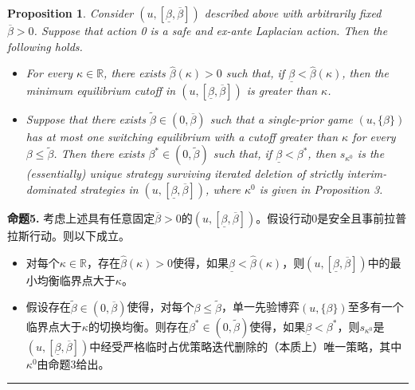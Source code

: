 \documentclass[12pt,a4paper]{article}
\newenvironment{translation}
  {\par\noindent\color{darkblue}\ignorespaces}
  {\par\medskip\noindent\hrule\par\medskip}
\newtheorem{proposition}[theorem]{Proposition}
\theoremstyle{definition}
\theoremstyle{remark}
\begin{document}
\begin{proposition}
Consider $(u, [\underline{\beta}, \overline{\beta}])$ described above with arbitrarily fixed $\overline{\beta} > 0$. Suppose that action 0 is a safe and ex-ante Laplacian action. Then the following holds.

\begin{itemize}
\item For every $\kappa \in \mathbb{R}$, there exists $\hat{\beta}(\kappa) > 0$ such that, if $\underline{\beta} < \hat{\beta}(\kappa)$, then the minimum equilibrium cutoff in $(u, [\underline{\beta}, \overline{\beta}])$ is greater than $\kappa$.
\item Suppose that there exists $\tilde{\beta} \in (0, \overline{\beta})$ such that a single-prior game $(u, \{\beta\})$ has at most one switching equilibrium with a cutoff greater than $\kappa$ for every $\beta \le \tilde{\beta}$. Then there exists $\beta^* \in (0, \tilde{\beta})$ such that, if $\underline{\beta} < \beta^*$, then $s_{\kappa^0}$ is the (essentially) unique strategy surviving iterated deletion of strictly interim-dominated strategies in $(u, [\underline{\beta}, \overline{\beta}])$, where $\kappa^0$ is given in Proposition 3.
\end{itemize}
\end{proposition}
\begin{translation}
\color{darkblue}\textbf{命题5.} 考虑上述具有任意固定$\overline{\beta} > 0$的$(u, [\underline{\beta}, \overline{\beta}])$。假设行动0是安全且事前拉普拉斯行动。则以下成立。

\begin{itemize}
\item 对每个$\kappa \in \mathbb{R}$，存在$\hat{\beta}(\kappa) > 0$使得，如果$\underline{\beta} < \hat{\beta}(\kappa)$，则$(u, [\underline{\beta}, \overline{\beta}])$中的最小均衡临界点大于$\kappa$。
\item 假设存在$\tilde{\beta} \in (0, \overline{\beta})$使得，对每个$\beta \le \tilde{\beta}$，单一先验博弈$(u, \{\beta\})$至多有一个临界点大于$\kappa$的切换均衡。则存在$\beta^* \in (0, \tilde{\beta})$使得，如果$\underline{\beta} < \beta^*$，则$s_{\kappa^0}$是$(u, [\underline{\beta}, \overline{\beta}])$中经受严格临时占优策略迭代删除的（本质上）唯一策略，其中$\kappa^0$由命题3给出。
\end{itemize}
\end{translation}
\end{document}

